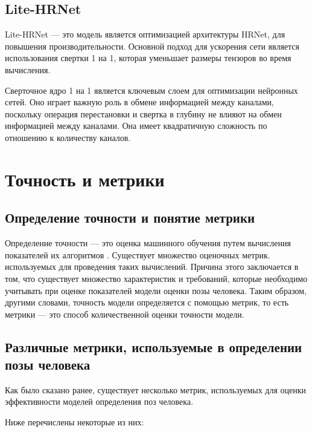 \subsection{Lite-HRNet}

Lite-HRNet \cite{WangSCJDZLMTWLX19} --- это модель является оптимизацией архитектуры HRNet, для повышения производительности. Основной подход для ускорения сети является использования свертки 1 на 1, которая уменьшает размеры тензоров во время вычисления.

Сверточное ядро 1 на 1 является ключевым слоем для оптимизации нейронных сетей. Оно играет важную роль в обмене информацией между каналами, поскольку операция перестановки и свертка в глубину не влияют на обмен информацией между каналами. Она имеет квадратичную сложность по отношению к количеству каналов.

\section{Точность и метрики}

\subsection{Определение точности и понятие метрики}

Определение точности --- это оценка машинного обучения путем вычисления показателей их алгоритмов \cite{vyugin}. 
Существует множество оценочных метрик. используемых для проведения таких вычислений.
Причина этого заключается в том, что существует множество характеристик и требований, которые необходимо учитывать при оценке показателей модели оценки позы человека.
Таким образом, другими словами, точность модели определяется с помощью метрик, то есть метрики --- это способ количественной оценки точности модели.

\subsection{Различные метрики, используемые в определении позы человека}

Как было сказано ранее, существует несколько метрик, используемых для оценки эффективности моделей определения поз человека.

Ниже перечислены некоторые из них:


